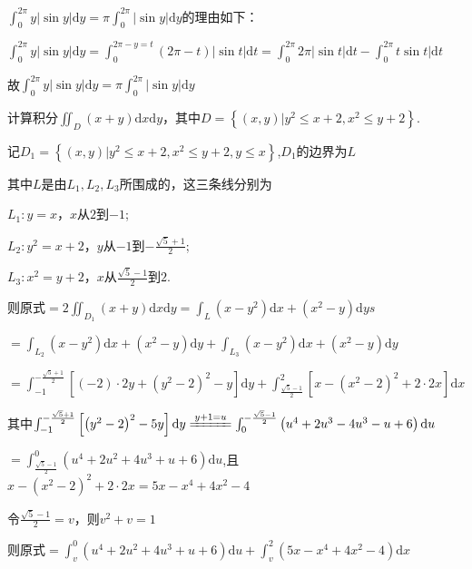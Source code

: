 \begin{xiti}
\begin{solution}
		\begin{note}
		$\int_{0}^{2 \pi} y|\sin y| \mathrm{d} y=\pi \int_{0}^{2 \pi}|\sin y| \mathrm{d} y$的理由如下：
		
		$\int_{0}^{2 \pi} y|\sin y| \mathrm{d} y=\int_{0}^{2 \pi-y=t}(2 \pi-t)|\sin t| \mathrm{d} t=\int_{0}^{2 \pi} 2 \pi|\sin t| \mathrm{d} t-\int_{0}^{2 \pi} t \sin t | \mathrm{d} t$
		
		故$\int_{0}^{2 \pi} y|\sin y| \mathrm{d} y=\pi \int_{0}^{2 \pi}|\sin y| \mathrm{d} y$
		\end{note}
	\end{solution}
	\item 计算积分$\iint_{D}(x+y) \mathrm{d} x \mathrm{d}y$，其中$D=\left\{(x, y) | y^{2} \leqslant x+2, x^{2} \leqslant y+2\right\}$.
	\begin{solution}
		记$D_{1}=\left\{(x, y) | y^{2} \leqslant x+2, x^{2} \leqslant y+2, y \leqslant x \right\}$,$D_{1}$的边界为$L$
		
		其中$L$是由$L_{1},L_{2},L_{3}$所围成的，这三条线分别为
		
		$L_{1}:y=x$，$x$从$2$到$-1$;
		
		$L_{2}:y^{2}=x+2$，$y$从$-1$到$-\frac{\sqrt{5}+1}{2}$;
		
		$L_{3}:x^{2}=y+2$，$x$从$\frac{\sqrt{5}-1}{2}$到$2$.
		
		则原式$=2 \iint_{D_{1}}(x+y) \mathrm{d} x \mathrm{d} y= \int_{L} (x-y^{2}) \mathrm{d} x + (x^{2}-y) \mathrm{d} ys$
		
		$=\int_{L_{2}}\left(x-y^{2}\right) \mathrm{d}x+\left(x^{2}-y\right) \mathrm{d}y+\int_{L_{3}}\left(x-y^{2}\right) \mathrm{d}x+\left(x^{2}-y\right) \mathrm{d}y $
		
		$=\int_{-1}^{-\frac{\sqrt{5}+1}{2}}\left[(-2) \cdot 2 y+\left(y^{2}-2\right)^{2}-y\right] \mathrm{d}y+\int_{\frac{\sqrt{5}-1}{2}}^{2}\left[x-\left(x^{2}-2\right)^{2}+2 \cdot 2 x\right] \mathrm{d}x$
		
		其中$\int_{-1}^{-\frac{\sqrt{5}+1}{2}}\left[\left(y^{2}-2\right)^{2}-5 y\right] \mathrm{d}y \xlongequal{y+1=u} \int_{0}^{-\frac{\sqrt{5}-1}{2}}\left(u^{4}+2 u^{3}-4 u^{3}-u+6\right) \mathrm{d}u$
		
		$=\int_{\frac{\sqrt{5}-1}{2}}^{0}\left(u^{4}+2 u^{2}+4 u^{3}+u+6\right) \mathrm{d}u$,且$x-\left(x^{2}-2\right)^{2}+2 \cdot 2 x=5 x -x^{4}+4x^{2}-4$
		
		令$\frac{\sqrt{5}-1}{2}=v$，则$v^{2}+v=1$
		
		则原式$=\int_{v}^{0}\left(u^{4}+2 u^{2}+4 u^{3}+u+6\right) \mathrm{d}u+\int_{v}^{2}\left(5 x-x^{4}+4 x^{2}-4\right) \mathrm{d}x$
		

\end{solution}
\end{xiti}
